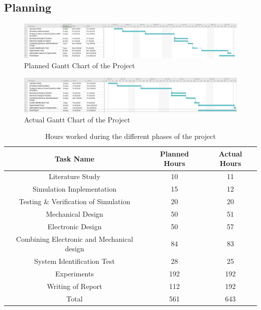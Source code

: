 \subsection{Planning}

\begin{figure}[h]
	\centering
	\includegraphics[scale=0.35]{./figs/planning_gantt/planned_ganttchart.jpg}
	\caption{Planned Gantt Chart of the Project}
	\label{fig:planned_ganttchart}
\end{figure}

\begin{figure}[h]
	\centering
	\includegraphics[scale=0.35]{./figs/planning_gantt/actual_ganttchart.jpg}
	\caption{Actual Gantt Chart of the Project}
	\label{fig:actual_ganttchart}
\end{figure}

\begin{table}[h]
	\centering
	\begin{tabular}{|c|c|c|}
		\hline
		Task Name & Planned Hours & Actual Hours \\
		\hline
		\hline
		Literature Study & 10 & 11 \\
		\hline
		Simulation Implementation & 15 & 12 \\
		\hline
		Testing \& Verification of Simulation & 20 & 20 \\
		\hline 
		Mechanical Design  & 50 & 51 \\
		\hline
		Electronic Design & 50 & 57 \\
		\hline
		Combining Electronic and Mechanical design & 84 & 83 \\
		\hline
		System Identification Test & 28 & 25 \\
		\hline
		Experiments & 192 & 192\\
		\hline
		Writing of Report & 112 & 192 \\
		\hline
		\hline
		Total & 561 & 643 \\
		\hline
		
	\end{tabular}
	\caption{Hours worked during the different phases of the project}
	\label{table:hours_worked}
\end{table}

